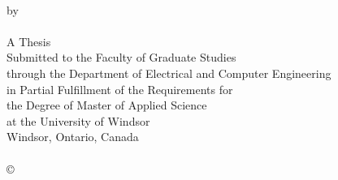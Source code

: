 \frontmatter
\begin{titlepage} %
   \begin{large}
   	\begin{center}
   	  \vspace*{0.5cm}
      {\bfseries \LARGE \ThesisTitle{}}\\
      \vspace{1.5cm}
      {\large by}\\
      \vspace{1.5cm}
      {\large \bfseries\ThesisAuthor{}}\\
      \vfill
      {A Thesis\\
      Submitted to the Faculty of Graduate Studies\\
      through the Department of Electrical and Computer Engineering\\
      in Partial Fulfillment of the Requirements for\\
      the Degree of Master of Applied Science\\
      at the University of Windsor}\\
      \vspace{2.5cm}
      Windsor, Ontario, Canada\\
      \vspace{1.5cm}
      \ThesisDefenceYear{}\\
      \vspace{1.5cm}
      {\copyright} \ThesisDefenceYear{} {\bfseries \ThesisAuthor{}}\\
   	\end{center}
   \end{large}
\end{titlepage}

